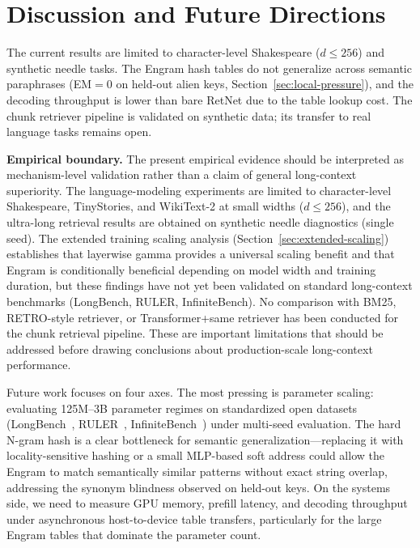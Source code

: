 \documentclass[preprint,12pt]{elsarticle}
\begin{document}
\section{Discussion and Future Directions}
\label{sec:discussion}

The current results are limited to character-level Shakespeare ($d \leq 256$) and synthetic needle tasks. The Engram hash tables do not generalize across semantic paraphrases (EM$=0$ on held-out alien keys, Section~\ref{sec:local-pressure}), and the decoding throughput is lower than bare RetNet due to the table lookup cost. The chunk retriever pipeline is validated on synthetic data; its transfer to real language tasks remains open.

\textbf{Empirical boundary.} The present empirical evidence should be interpreted as mechanism-level validation rather than a claim of general long-context superiority. The language-modeling experiments are limited to character-level Shakespeare, TinyStories, and WikiText-2 at small widths ($d \leq 256$), and the ultra-long retrieval results are obtained on synthetic needle diagnostics (single seed). The extended training scaling analysis (Section~\ref{sec:extended-scaling}) establishes that layerwise gamma provides a universal scaling benefit and that Engram is conditionally beneficial depending on model width and training duration, but these findings have not yet been validated on standard long-context benchmarks (LongBench, RULER, InfiniteBench). No comparison with BM25, RETRO-style retriever, or Transformer+same retriever has been conducted for the chunk retrieval pipeline. These are important limitations that should be addressed before drawing conclusions about production-scale long-context performance.

Future work focuses on four axes. The most pressing is parameter scaling: evaluating 125M--3B parameter regimes on standardized open datasets (LongBench~\cite{longbench}, RULER~\cite{ruler}, InfiniteBench~\cite{infinitebench}) under multi-seed evaluation. The hard N-gram hash is a clear bottleneck for semantic generalization---replacing it with locality-sensitive hashing or a small MLP-based soft address could allow the Engram to match semantically similar patterns without exact string overlap, addressing the synonym blindness observed on held-out keys. On the systems side, we need to measure GPU memory, prefill latency, and decoding throughput under asynchronous host-to-device table transfers, particularly for the large Engram tables that dominate the parameter count.
\end{document}
